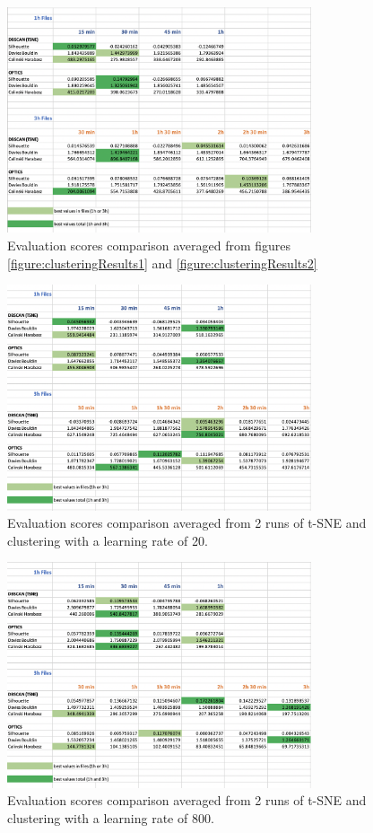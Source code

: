 \begin{figure}[H]
  \centering
  \includegraphics[width=0.8\textwidth]{./images/clusteringResults/clusteringResults3.png}
  \caption{Evaluation scores comparison averaged from figures \ref{figure:clusteringResults1} and \ref{figure:clusteringResults2}}
  \label{figure:clusteringResults3}
\end{figure}

\begin{figure}[H]
  \centering
  \includegraphics[width=0.8\textwidth]{./images/clusteringResults/clusteringResults4.png}
  \caption{Evaluation scores comparison averaged from 2 runs of t-SNE and clustering with a learning rate of 20.}
  \label{figure:clusteringResults4}
\end{figure}

\begin{figure}[H]
  \centering
  \includegraphics[width=0.8\textwidth]{./images/clusteringResults/clusteringResults5.png}
  \caption{Evaluation scores comparison averaged from 2 runs of t-SNE and clustering with a learning rate of 800.}
  \label{figure:clusteringResults5}
\end{figure}


\clearpage